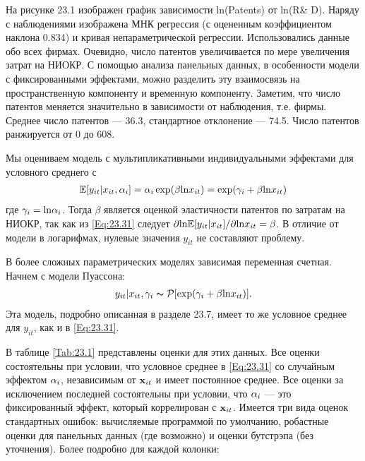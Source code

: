На рисунке 23.1 изображен график зависимости ln(Patents) от ln(R\& D). Наряду с наблюдениями изображена МНК регрессия (с оцененным коэффициентом наклона 0.834) и кривая непараметрической регрессии. Использовались данные обо всех фирмах. Очевидно, число патентов увеличивается по мере увеличения затрат на НИОКР. С помощью анализа панельных данных, в особенности модели с фиксированными эффектами, можно разделить эту взаимосвязь на пространственную компоненту и временную компоненту. Заметим, что число патентов меняется значительно в зависимости от наблюдения, т.е. фирмы. Среднее число патентов --- 36.3, стандартное отклонение --- 74.5. Число патентов ранжируется от 0 до 608.

Мы оцениваем модель с мультипликативными индивидуальными эффектами для условного среднего с 
\begin{align}
\mathbb{E}[y_{it}|x_{it}, \alpha_i] = \alpha_i \exp (\beta \mathrm{ln} x_{it})=\exp  (\gamma_i+\beta \mathrm{ln} x_{it})
\label{Eq:23.31}
\end{align}
где $\gamma_i=\mathrm{ln} \alpha_i$. Тогда $\beta$ является оценкой эластичности патентов по затратам на НИОКР, так как из \ref{Eq:23.31} следует $\partial \mathrm{ln} \mathbb{E}[y_{it}|x_{it}]/\partial \mathrm{ln} x_{it}=\beta$. В отличие от модели в логарифмах, нулевые значения $y_{it}$ не составляют проблему.

В более сложных параметрических моделях зависимая переменная счетная. Начнем с модели Пуассона:
\begin{align}
y_{it}|x_{it}, \gamma_i \thicksim \mathcal{P}[\exp (\gamma_i + \beta \mathrm{ln} x_{it})].
\label{Eq:23.32}
\end{align}
Эта модель, подробно описанная в разделе 23.7, имеет то же условное среднее для $y_{it}$, как и в \ref{Eq:23.31}.

В таблице \ref{Tab:23.1} представлены оценки для этих данных. Все оценки состоятельны при условии, что условное среднее в \ref{Eq:23.31} со случайным эффектом $\alpha_i$, независимым от $\mathbf{x}_{it}$ и имеет постоянное среднее. Все оценки за исключением последней состоятельны при условии, что $\alpha_i$ --- это фиксированный эффект, который коррелирован с $\mathbf{x}_{it}$. Имеется три вида оценок стандартных ошибок: вычисляемые программой по умолчанию, робастные оценки для панельных данных (где возможно) и оценки бутстрэпа (без уточнения). Более подробно для каждой колонки:

